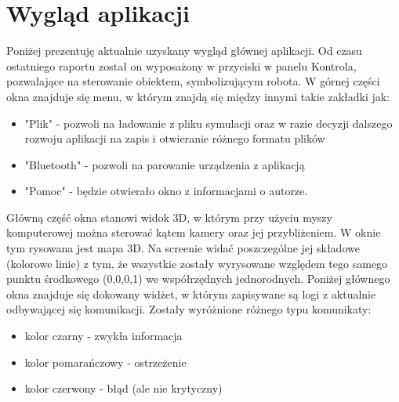 \documentclass[a4paper,12pt]{article}
\begin{document}
\section{Wygląd aplikacji}
Poniżej prezentuję aktualnie uzyskany wygląd głównej aplikacji. Od czasu ostatniego raportu został on wyposażony w przyciski w panelu Kontrola, pozwalające na sterowanie obiektem, symbolizującym robota. W górnej części okna znajduje się menu, w którym znajdą się między innymi takie zakładki jak:
\begin{itemize}
\item "Plik" - pozwoli na ładowanie z pliku symulacji oraz w razie decyzji dalszego rozwoju aplikacji na zapis i otwieranie różnego formatu plików
\item "Bluetooth" - pozwoli na parowanie urządzenia z aplikacją
\item "Pomoc" - będzie otwierało okno z informacjami o autorze.
\end{itemize}
Główną część okna stanowi widok 3D, w którym przy użyciu myszy komputerowej można sterować kątem kamery oraz jej przybliżeniem. W oknie tym rysowana jest mapa 3D.
Na screenie widać poszczególne jej składowe (kolorowe linie) z tym, że wszystkie zostały wyrysowane względem tego samego punktu środkowego (0,0,0,1) we współrzędnych
jednorodnych. 
Poniżej głównego okna znajduje się dokowany widżet, w którym zapisywane są logi z aktualnie odbywającej się komunikacji. Zostały wyróżnione różnego typu komunikaty:
\begin{itemize}
\item kolor czarny - zwykła informacja
\item kolor pomarańczowy - ostrzeżenie
\item kolor czerwony - błąd (ale nie krytyczny)
\end{itemize}
\end{document}
